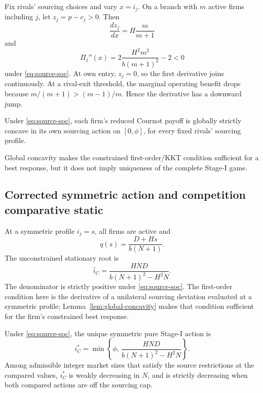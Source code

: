 Fix rivals' sourcing choices and vary \(x=i_j\).  On a branch with \(m\) active firms including \(j\), let \(z_j=p-c_j>0\).  Then
\[
\frac{dz_j}{dx}=H\frac{m}{m+1}
\]
and
\begin{equation}
\Pi_j''(x)=
2\frac{H^2m^2}{b(m+1)^2}-2<0
\label{eq:branch-curvature}
\end{equation}
under \eqref{eq:source-soc}.  At own entry, \(z_j=0\), so the first derivative joins continuously.  At a rival-exit threshold, the marginal operating benefit drops because \(m/(m+1)>(m-1)/m\).  Hence the derivative has a downward jump.

\begin{lemma}
\label{lem:global-concavity}
Under \eqref{eq:source-soc}, each firm's reduced Cournot payoff is globally strictly concave in its own sourcing action on \([0,\phi]\), for every fixed rivals' sourcing profile.
\end{lemma}

Global concavity makes the constrained first-order/KKT condition sufficient for a best response, but it does not imply uniqueness of the complete Stage-I game.

\subsection{Corrected symmetric action and competition comparative static}

At a symmetric profile \(i_j=s\), all firms are active and
\[
q(s)=\frac{D+Hs}{b(N+1)}.
\]
The unconstrained stationary root is
\begin{equation}
\bar i_C
=
\frac{HND}{b(N+1)^2-H^2N}.
\label{eq:iCbar}
\end{equation}
The denominator is strictly positive under \eqref{eq:source-soc}.  The first-order condition here is the derivative of a unilateral sourcing deviation evaluated at a symmetric profile; Lemma~\ref{lem:global-concavity} makes that condition sufficient for the firm's constrained best response.

\begin{proposition}
\label{prop:symmetric-cournot}
Under \eqref{eq:source-soc}, the unique symmetric pure Stage-I action is
\begin{equation}
i_C^*
=
\min\left\{
\phi,\,
\frac{HND}{b(N+1)^2-H^2N}
\right\}.
\label{eq:iCstar}
\end{equation}
Among admissible integer market sizes that satisfy the source restrictions at the compared values, \(i_C^*\) is weakly decreasing in \(N\), and is strictly decreasing when both compared actions are off the sourcing cap.
\end{proposition}

